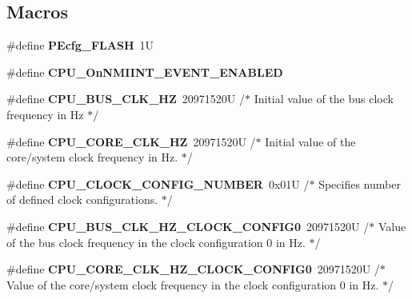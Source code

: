 \subsection*{Macros}
\begin{DoxyCompactItemize}
\item 
\mbox{\label{group___c_p_u__module_gae2f84b335ab99b9e98d41e8a530b1540}} 
\#define {\bfseries P\+Ecfg\+\_\+\+F\+L\+A\+SH}~1U
\item 
\mbox{\label{group___c_p_u__module_gae675667345a8afb6e8d2f05ef1d84ad7}} 
\#define {\bfseries C\+P\+U\+\_\+\+On\+N\+M\+I\+I\+N\+T\+\_\+\+E\+V\+E\+N\+T\+\_\+\+E\+N\+A\+B\+L\+ED}
\item 
\mbox{\label{group___c_p_u__module_ga532954dc988486bfe48200c796380120}} 
\#define {\bfseries C\+P\+U\+\_\+\+B\+U\+S\+\_\+\+C\+L\+K\+\_\+\+HZ}~20971520\+U /$\ast$ Initial value of the bus clock frequency in Hz $\ast$/
\item 
\mbox{\label{group___c_p_u__module_ga9dee0abd722c849e54c662ab11a1d2cf}} 
\#define {\bfseries C\+P\+U\+\_\+\+C\+O\+R\+E\+\_\+\+C\+L\+K\+\_\+\+HZ}~20971520\+U /$\ast$ Initial value of the core/system clock frequency in Hz.  $\ast$/
\item 
\mbox{\label{group___c_p_u__module_ga37d43e31f65dd620040aec363e95b5a8}} 
\#define {\bfseries C\+P\+U\+\_\+\+C\+L\+O\+C\+K\+\_\+\+C\+O\+N\+F\+I\+G\+\_\+\+N\+U\+M\+B\+ER}~0x01\+U /$\ast$ Specifies number of defined clock configurations. $\ast$/
\item 
\mbox{\label{group___c_p_u__module_ga39018ca5854bea36700d3b30f6c08195}} 
\#define {\bfseries C\+P\+U\+\_\+\+B\+U\+S\+\_\+\+C\+L\+K\+\_\+\+H\+Z\+\_\+\+C\+L\+O\+C\+K\+\_\+\+C\+O\+N\+F\+I\+G0}~20971520\+U /$\ast$ Value of the bus clock frequency in the clock configuration 0 in Hz. $\ast$/
\item 
\mbox{\label{group___c_p_u__module_ga64b9007ea0c78e588ed565373bcec805}} 
\#define {\bfseries C\+P\+U\+\_\+\+C\+O\+R\+E\+\_\+\+C\+L\+K\+\_\+\+H\+Z\+\_\+\+C\+L\+O\+C\+K\+\_\+\+C\+O\+N\+F\+I\+G0}~20971520\+U /$\ast$ Value of the core/system clock frequency in the clock configuration 0 in Hz. $\ast$/

\end{DoxyCompactItemize}
